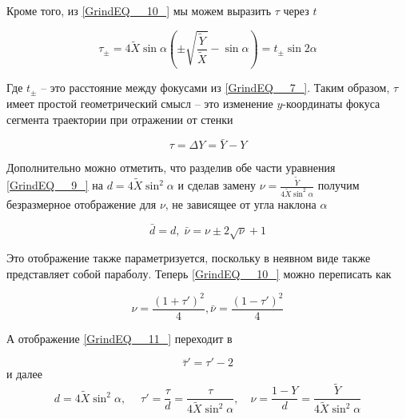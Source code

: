 \documentclass[a4paper]{article}
\begin{document}
Кроме того, из \eqref{GrindEQ__10_} мы можем выразить $\tau $ через $t$

\begin{equation} \label{GrindEQ__11_1_} \tau _{\pm } =4\tilde{X}\sin \alpha \left(\pm \sqrt{\frac{\tilde{Y}}{\tilde{X}} } -\sin \alpha \right)=t_{\pm } \sin 2\alpha  \end{equation}

Где $t_{\pm } $ -- это расстояние между фокусами из \eqref{GrindEQ__7_}. Таким образом, $\tau $ имеет простой геометрический смысл -- это изменение $y$-координаты фокуса сегмента траектории при отражении от стенки

\begin{equation} \label{GrindEQ__11_2_} \tau =\Delta Y=\bar{Y}-Y \end{equation}

Дополнительно можно  отметить, что разделив обе части уравнения \eqref{GrindEQ__9_} на $d=4\tilde{X}\sin ^{2} \alpha $ и сделав замену $\nu =\frac{\tilde{Y}}{4\tilde{X}\sin ^{2} \alpha } $ получим безразмерное отображение для $\nu $, не зависящее от угла наклона $\alpha $

\begin{equation} \label{GrindEQ__11_2_1_}\bar{d}=d,\; \bar{\nu }=\nu \pm 2\sqrt{\nu } +1 \end{equation}


Это отображение также параметризуется, поскольку в неявном виде также представляет собой параболу. Теперь \eqref{GrindEQ__10_} можно переписать как

\begin{equation} \label{GrindEQ__11_2_2_}\nu =\frac{\left(1+\tau '\right)^{2} }{4} ,\bar{\nu }=\frac{\left(1-\tau '\right)^{2} }{4} \end{equation}

А отображение \eqref{GrindEQ__11_} переходит в

\begin{equation} \label{GrindEQ__11_2_3_}\bar{\tau }'=\tau '-2 \end{equation}
и далее
\begin{equation} \label{GrindEQ__11_2_4_} d=4\tilde{X}\sin ^{2} \alpha ,\; \quad \tau '=\frac{\tau }{d} =\frac{\tau }{4\tilde{X}\sin ^{2} \alpha } ,\quad \nu =\frac{1-Y}{d} =\frac{\tilde{Y}}{4\tilde{X}\sin ^{2} \alpha } \end{equation}
\end{document}
